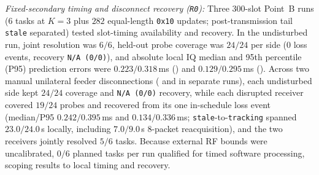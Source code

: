 \emph{Fixed-secondary timing and disconnect recovery (\texttt{R0}):} Three $300$-slot Point~B \modejc{} runs ($6$ tasks at $K{=}3$ plus $282$ equal-length \texttt{0x10} updates; post-transmission tail \texttt{stale} separated) tested slot-timing availability and recovery. In the undisturbed run, joint resolution was $6/6$, held-out probe coverage was $24/24$ per side ($0$ loss events, recovery \texttt{N/A (0/0)}), and absolute local IQ median and 95th percentile (P95) prediction errors were $0.223/0.318$\,ms (\ble{}) and $0.129/0.295$\,ms (\stdfour{}). Across two manual unilateral feeder disconnections (\ble{} and \stdfour{} in separate runs), each undisturbed side kept $24/24$ coverage and \texttt{N/A (0/0)} recovery, while each disrupted receiver covered $19/24$ probes and recovered from its one in-schedule loss event (median/P95 $0.242/0.395$\,ms and $0.134/0.336$\,ms; \texttt{stale}-to-\texttt{tracking} spanned $23.0/24.0$\,s locally, including $7.0/9.0$\,s $8$-packet reacquisition), and the two receivers jointly resolved $5/6$ tasks. Because external RF bounds were uncalibrated, $0/6$ planned tasks per run qualified for timed software processing, scoping results to local timing and recovery.
